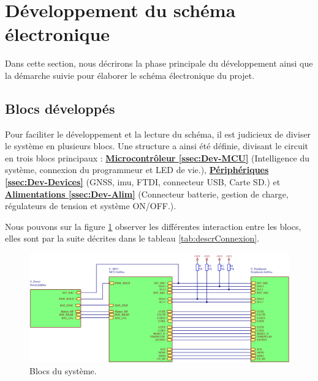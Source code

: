 \newpage
\section{Développement du schéma électronique} \label{sec:Dev-Schematique}
Dans cette section, nous décrirons la phase principale du développement ainsi que la démarche suivie pour élaborer le schéma électronique du projet.

\subsection{Blocs développés} \label{ssec:Dev-blocs}
Pour faciliter le développement et la lecture du schéma, il est judicieux de diviser le système en plusieurs blocs. Une structure a ainsi été définie, divisant le circuit en trois blocs principaux : \hyperref[ssec:Dev-MCU]{\textbf{Microcontrôleur \ref{ssec:Dev-MCU}}} (Intelligence du système, connexion du programmeur et LED de vie.), \hyperref[ssec:Dev-Devices]{\textbf{Périphériques \ref{ssec:Dev-Devices}}} (\gls{GNSS}, \gls{imu}, \gls{FTDI}, connecteur USB, Carte SD.) et \hyperref[ssec:Dev-Alim]{\textbf{Alimentations \ref{ssec:Dev-Alim}}} (Connecteur batterie, gestion de charge, régulateurs de tension et système ON/OFF.).

Nous pouvons sur la figure \ref{fig:blocs} observer les différentes interaction entre les blocs, elles sont par la suite décrites dans le tableau \ref{tab:descrConnexion}.

\begin{figure}[h]
	\centering
	\includegraphics[width=.85\linewidth]{../figures/etude/sch/BLOCS}
	\caption{Blocs du système.}
	\label{fig:blocs}
\end{figure}


